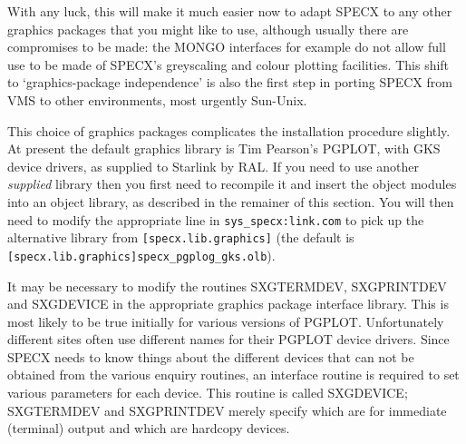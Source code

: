 \documentclass[11pt,twoside]{report}
\begin{document}
With any luck, this will make it much easier now to adapt SPECX to any
other graphics packages that you might like to use, although usually
there are compromises to be made: the MONGO interfaces for example do
not allow full use to be made of SPECX's greyscaling and colour
plotting facilities. This shift to `graphics-package independence' is
also the first step in porting SPECX from VMS to other environments,
most urgently Sun-Unix.

This choice of graphics packages complicates the installation procedure
slightly. At present the default graphics library is Tim Pearson's PGPLOT, with
GKS device drivers, as supplied to Starlink by RAL. If you need to use another
{\em supplied} library then you first need to recompile it and insert the
object modules into an object library, as described in the remainer of this
section. You will then need to modify the appropriate line in
\verb+sys_specx:link.com+ to pick up the alternative library from
\verb+[specx.lib.graphics]+ (the default is\\
\verb+[specx.lib.graphics]specx_pgplog_gks.olb+).

It may be necessary to modify the
routines SXGTERMDEV, SXGPRINTDEV and SXGDEVICE in the appropriate graphics
package interface library. This is most likely to be true initially for various
versions of PGPLOT. Unfortunately different sites often use different names for
their PGPLOT device drivers. Since SPECX needs to know things about the
different devices that can not be obtained from the various enquiry routines,
an interface routine is required to set various parameters for each device.
This routine is called SXGDEVICE; SXGTERMDEV and SXGPRINTDEV merely specify
which are for immediate (terminal) output and which are hardcopy devices.
\end{document}
